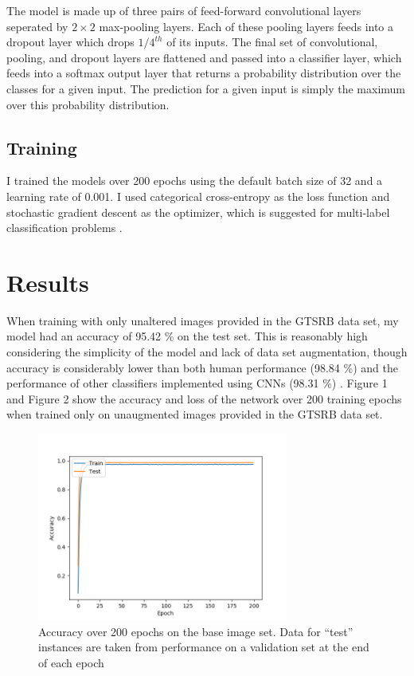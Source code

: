 \documentclass[letterpaper,twocolumn,10pt]{article}
\begin{document}
The model is made up of three pairs of feed-forward convolutional layers seperated by $2 \times 2$ max-pooling layers. Each of these pooling layers feeds into a dropout layer which drops $1/4^{th}$ of its inputs. The final set of convolutional, pooling, and dropout layers are flattened and passed into a classifier layer, which feeds into a softmax output layer that returns a probability distribution over the classes for a given input. The prediction for a given input is simply the maximum over this probability distribution.

\subsection{Training}

I trained the models over 200 epochs using the default batch size of 32 and a learning rate of 0.001. I used categorical cross-entropy as the loss function and stochastic gradient descent as the optimizer, which is suggested for multi-label classification problems \cite{lasagne_loss}.

\section{Results}

When training with only unaltered images provided in the GTSRB data set, my model had an accuracy of 95.42 \% on the test set. This is reasonably high considering the simplicity of the model and lack of data set augmentation, though accuracy is considerably lower than both human performance (98.84 \%) and the performance of other classifiers implemented using CNNs (98.31 \%) \cite{sermanet_convolutional_2012, sermanet_traffic_2011, stallkamp_german_2011, stallkamp_man_2012}. Figure 1 and Figure 2 show the accuracy and loss of the network over 200 training epochs when trained only on unaugmented images provided in the GTSRB data set.

\begin{figure}
\includegraphics[width=3.25in]{accuracy}
\caption{Accuracy over 200 epochs on the base image set. Data for ``test'' instances are taken from performance on a validation set at the end of each epoch}
\end{figure}
\end{document}
